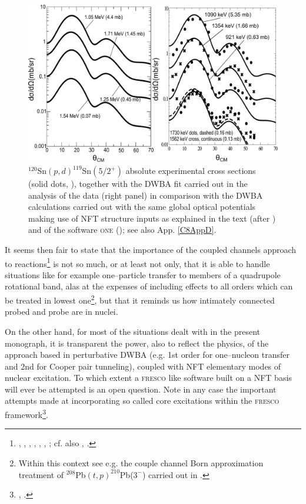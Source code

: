     \begin{figure}
    \centerline{\includegraphics*[width=\textwidth,angle=0]{C6/figs_C6/cross_teor_exp.pdf}}
    \caption{ $^{120}$Sn$(p,d)^{119}$Sn$(5/2^+)$ absolute experimental cross sections (solid dots, \cite{Dickey:82}), together with the DWBA fit carried out in the analysis of the data (right panel) in comparison with the DWBA calculations carried out with the same global optical potentials  making use of NFT structure inputs as explained in the text (after \cite{Idini:15}) and of the software \textsc{one} (\cite{Potel:12b}); see also App. \ref{C8AppD}.}\label{fig6.2.3}
    \end{figure}
  
  It seems then fair to state that the importance of the coupled channels approach to reactions\footnote{ \cite{Thompson:88}, \cite{Thompson:13}, \cite{Tamura:70}, \cite{Ascuitto:69}, \cite{Ascuitto:70}, \cite{Ascuitto:71}, \cite{Ascuitto:72}; cf. also \cite{Fernandez:10}, \cite{Fernandez:10b}.} is not so much, or at least not only, that it is able to handle situations like for example one--particle transfer to members of a quadrupole rotational band, alas at the expenses of including effects to all orders which can be treated in lowest one\footnote{Within this context see e.g. the couple channel Born approximation treatment of $^{208}$Pb$(t,p)^{210}$Pb($3^-$) carried out in \cite{Flynn:72b}.}, but that it reminds us how intimately connected  probed and probe are in nuclei.
  
  
  
  
  On the other hand, for most of the situations dealt with in the present monograph, it is transparent the power, also to reflect the physics, of the approach based in perturbative DWBA (e.g. 1st order for one--nucleon transfer and 2nd for Cooper pair tunneling), coupled  
  with NFT elementary modes of nuclear excitation.
  To which extent a \textsc{fresco} like software built on a NFT basis will ever be attempted is an open question. Note in any case the important attempts made at incorporating so called core excitations within the \textsc{fresco} framework\footnote{\cite{Fernandez:10}, \cite{Fernandez:10b}.}. 
  

